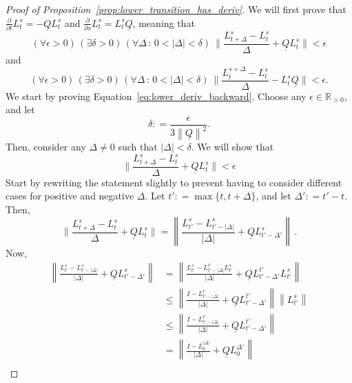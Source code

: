 \documentclass[10pt]{paper}
\theoremstyle{definition}
\newcommand{\reals}{\mathbb{R}}
\newcommand{\realspos}{\reals_{>0}}
\newcommand{\lbound}{L}
\newcommand{\lrate}{\underline{Q}}
\newcommand{\norm}[1]{\left\lVert #1 \right\rVert}
\newcommand{\coloneqq}{:\!=}
\begin{document}
\begin{proof}[Proof of Proposition~\ref{prop:lower_transition_has_deriv}]
We will first prove that $\frac{\partial}{\partial t}L_t^s=-\lrate L_t^s$ and $\frac{\partial}{\partial s}L_t^s=L_t^s\lrate$, meaning that
\begin{equation}\label{eq:lower_deriv_backward}
(\forall\epsilon>0)\,
(\exists\delta>0)\,
(\forall\Delta\,:\,0<\lvert\Delta\rvert <\delta)~
\Big\lVert\frac{L_{t+\Delta}^s-L_t^s}{\Delta}+\lrate L_t^s\Big\rVert<\epsilon
\end{equation}
and
\begin{equation}\label{eq:lower_deriv_forward}
(\forall\epsilon>0)\,
(\exists\delta>0)\,
(\forall\Delta\,:\,0<\lvert\Delta\rvert<\delta)~
\Big\lVert\frac{L_{t}^{s+\Delta}-L_t^s}{\Delta}-\lbound_t^s\lrate \Big\rVert<\epsilon.
\end{equation}
We start by proving Equation~\eqref{eq:lower_deriv_backward}. Choose any $\epsilon\in\realspos$, and let
\begin{equation}\label{eq:derivative_max_delta}
\delta \coloneqq \frac{\epsilon}{3\norm{\lrate}^2}.
\end{equation}
Then, consider any $\Delta\neq 0$ such that $\lvert\Delta\rvert<\delta$. We will show that
\begin{equation*}
\Big\lVert\frac{L_{t+\Delta}^s-L_t^s}{\Delta}+\lrate L_t^s\Big\rVert<\epsilon
\end{equation*}
Start by rewriting the statement slightly to prevent having to consider different cases for positive and negative $\Delta$. Let $t'\coloneqq\max\{t,t+\Delta\}$, and let $\Delta'\coloneqq t'-t$. Then,
\begin{equation*}
\Big\lVert\frac{L_{t+\Delta}^s-L_t^s}{\Delta}+\lrate L_t^s\Big\rVert = \norm{\frac{L_{t'}^s - L_{t'-\lvert\Delta\rvert}^s}{\lvert\Delta\rvert}+\lrate L_{t'-\Delta'}^s}\,.
\end{equation*}
Now,
\begin{align*}
\norm{\frac{L_{t'}^s - L_{t'-\lvert\Delta\rvert}^s}{\lvert\Delta\rvert}+\lrate L_{t'-\Delta'}^s} &= \norm{\frac{L_{t'}^s - L_{t'-\lvert\Delta\rvert}^{t'}L_{t'}^s}{\lvert\Delta\rvert}+\lrate L_{t'-\Delta'}^{t'}L_{t'}^s} \\
 &\leq \norm{\frac{I - L_{t'-\lvert\Delta\rvert}^{t'}}{\lvert\Delta\rvert}+\lrate L_{t'-\Delta'}^{t'}}\norm{L_{t'}^s} \\
 &\leq \norm{\frac{I - L_{t'-\lvert\Delta\rvert}^{t'}}{\lvert\Delta\rvert}+\lrate L_{t'-\Delta'}^{t'}} \\
 &= \norm{\frac{I - L_{0}^{\lvert\Delta\rvert}}{\lvert\Delta\rvert}+\lrate L_{0}^{\Delta'}} \\

\end{align*}
\end{proof}
\end{document}
